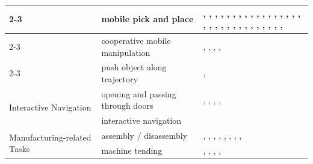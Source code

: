 \begin{table}[p]
\begin{tabular}{|p{4cm}|p{5cm}|p{15cm}|}
\cline{2-3}
    & mobile pick and place                                          & \cite{Li2022BEHAVIOR1KAB}, \cite{Sayyaadi2014ControlON}, \cite{Youngquist2022EvaluatingSA}, \cite{Yamazaki2012HomeAssistantRF}, \cite{Stckler2009IntegratingIM}, \cite{Schmalstieg2023LearningHI}, \cite{Orsula2022LearningTG}, \cite{Pohl2024MAkEableMA}, \cite{Tsay2010MaterialHO}, \cite{Arm2024PedipulateEM}, \cite{Lee2018PlanningAC}, \cite{Toner2024PRFAP}, \cite{Partovi2017ReactiveIM}, \cite{Deng2017ReinforcementLO}, \cite{Li2017ReinforcementLO}, \cite{Pedersen2016RobotSF}, \cite{Kostavelis2022RoboticAI}, \cite{Lim2008MultipleHC}, \cite{Kiyokawa2025SelfSupervisedLO}, \cite{Huang2023SkillTA}, \cite{Rosen2023SynthesizingNA}, \cite{Karumanchi2017TeamRS}, \cite{Thakar2018TowardsTT}, \cite{Choi2009HandIO}, \cite{Nagatani2000MotionDF}, \cite{Jauhri2022RobotLO}, \cite{Yang2023LearnTC}, \cite{Lopes2026CARGOAM}, \cite{Wu2024InTW}, \cite{Shan2026DockAnywhereDV}, \cite{Mounsif2020BAMBA}, \cite{Yokoyama2023ASCAS} \\
\cline{2-3}
    & cooperative mobile manipulation                                & \cite{Sayyaadi2014ControlON}, \cite{Lee2018PlanningAC}, \cite{Chang2006AnalysisOA}, \cite{Stroupe2005BehaviorbasedMC}, \cite{Kim2022LearningAG} \\
\cline{2-3}
    & push object along trajectory                                   & \cite{Rigo2022ContactOF}, \cite{Arm2024PedipulateEM} \\
\hline
\multirow{2}{*}{\parbox{3cm}{Interactive Navigation}}
    & opening and passing through doors                              & \cite{Gray2013ASP}, \cite{Schwarz2016HybridDL}, \cite{Karumanchi2017TeamRS}, \cite{Nagatani1996DesigningSA}, \cite{Nagatani1996DooropeningBO} \\
\cline{2-3}
    & interactive navigation                                         & \cite{Konidaris2012RobotLF} \\
\hline
\multirow{2}{*}{\parbox{4cm}{Manufacturing-related Tasks}}
    & assembly / disassembly                                           & \cite{Partovi2017ReactiveIM}, \cite{Peng2024RevolutionizingBD}, \cite{Pedersen2016RobotSF}, \cite{Lim2019SkillbasedAA}, \cite{Amaral2017SkillbasedAA}, \cite{Yang2022VariableIS}, \cite{Stroupe2005BehaviorbasedMC}, \cite{Lee2023DevelopmentAV}, \cite{Shi2021MaximizingTU} \\
\cline{2-3}
    & machine tending                                                & \cite{Arrais2019ApplicationOT}, \cite{Andersen2017IntegrationOA}, \cite{Partovi2017ReactiveIM}, \cite{Pedersen2016RobotSF}, \cite{Knobbe2022CorePI} \\

\end{tabular}
\end{table}
